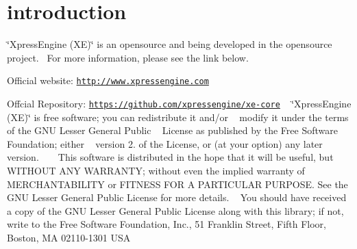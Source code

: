 \hypertarget{index_intro}{}\section{introduction}\label{index_intro}
\char`\"{}\+Xpress\+Engine (\+X\+E)\char`\"{} is an opensource and being developed in the opensource project.~\newline
For more information, please see the link below.
\begin{DoxyItemize}
\item Official website\+: \href{http://www.xpressengine.com}{\tt http\+://www.\+xpressengine.\+com}
\item Offcial Repository\+: \href{https://github.com/xpressengine/xe-core}{\tt https\+://github.\+com/xpressengine/xe-\/core} ~\newline
\char`\"{}\+Xpress\+Engine (\+X\+E)\char`\"{} is free software; you can redistribute it and/or ~\newline
modify it under the terms of the G\+NU Lesser General Public ~\newline
License as published by the Free Software Foundation; either ~\newline
version 2. of the License, or (at your option) any later version. ~\newline
~\newline
This software is distributed in the hope that it will be useful, but W\+I\+T\+H\+O\+UT A\+NY W\+A\+R\+R\+A\+N\+TY; without even the implied warranty of M\+E\+R\+C\+H\+A\+N\+T\+A\+B\+I\+L\+I\+TY or F\+I\+T\+N\+E\+SS F\+OR A P\+A\+R\+T\+I\+C\+U\+L\+AR P\+U\+R\+P\+O\+SE. See the G\+NU Lesser General Public License for more details. ~\newline
You should have received a copy of the G\+NU Lesser General Public License along with this library; if not, write to the Free Software Foundation, Inc., 51 Franklin Street, Fifth Floor, Boston, MA 02110-\/1301 U\+SA 
\end{DoxyItemize}
